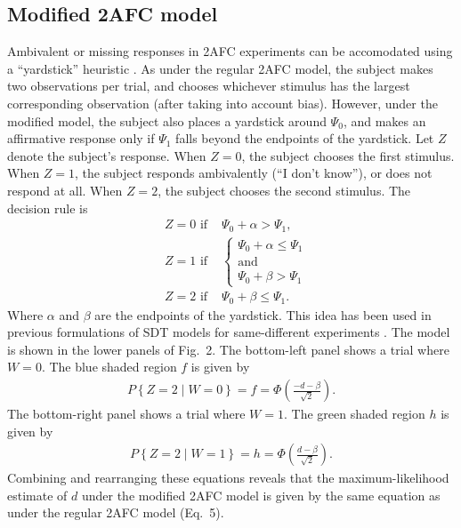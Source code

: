 \documentclass[man]{apa6}
\begin{document}
\subsection{Modified 2AFC model}
Ambivalent or missing responses in 2AFC experiments can be accomodated using a ``yardstick'' heuristic \parencite{decarlosignal2013}. As under the regular 2AFC model, the subject makes two observations per trial, and chooses whichever stimulus has the largest corresponding observation (after taking into account bias). However, under the modified model, the subject also places a yardstick around $\Psi_0$, and makes an affirmative response only if $\Psi_1$ falls beyond the endpoints of the yardstick. Let $Z$ denote the subject's response. When $Z=0$, the subject chooses the first stimulus. When $Z=1$, the subject responds ambivalently (``I don't know''), or does not respond at all. When $Z=2$, the subject chooses the second stimulus. The decision rule is
\begin{eqnarray*}
&Z=0\textrm{ if }&\Psi_0+\alpha>\Psi_1\textrm{,}\\
&Z=1\textrm{ if }&\left\{ \begin{array}{cl}
\Psi_0+\alpha{}\le\Psi_1\\
\textrm{and}\\
\Psi_0+\beta>\Psi_1
       \end{array} \right.\\
&Z=2\textrm{ if }&\Psi_0+\beta{}\le\Psi_1\textrm{.}
\end{eqnarray*}
Where $\alpha$ and $\beta$ are the endpoints of the yardstick. This idea has been used in previous formulations of SDT models for same-different experiments \parencite{decarlosignal2013}. The model is shown in the lower panels of Fig.~2. The bottom-left panel shows a trial where $W=0$. The blue shaded region $f$ is given by
\begin{eqnarray*}
P\left\{Z=2\mid{}W=0\right\}=f=\Phi\left(\frac{-d-\beta}{\sqrt{2}}\right)\textrm{.}
\end{eqnarray*}
The bottom-right panel shows a trial where $W=1$. The green shaded region $h$ is given by
\begin{eqnarray*}
P\left\{Z=2\mid{}W=1\right\}=h=\Phi\left(\frac{d-\beta}{\sqrt{2}}\right)\textrm{.}
\end{eqnarray*}Combining and rearranging these equations reveals that the maximum-likelihood estimate of $d$ under the modified 2AFC model is given by the same equation as under the regular 2AFC model (Eq.~5).
\end{document}
